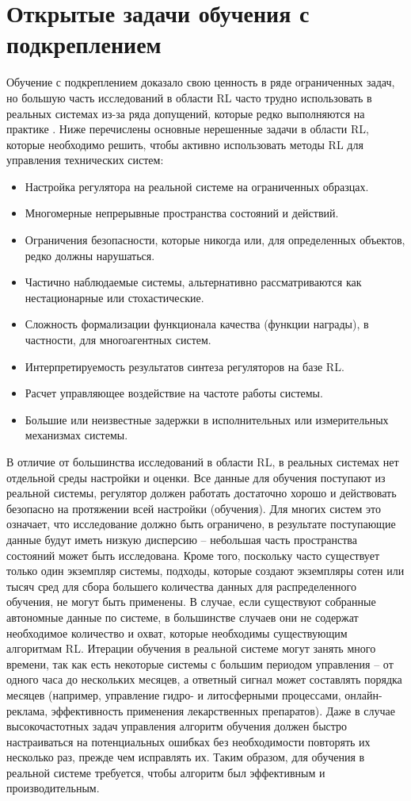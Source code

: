 \section{Открытые задачи обучения с подкреплением}

Обучение с подкреплением доказало свою ценность в ряде ограниченных задач, но большую часть исследований в области RL часто трудно использовать в реальных системах из-за ряда допущений, которые редко выполняются на практике \cite{dulac2019challenges}. Ниже перечислены основные нерешенные задачи в области RL, которые необходимо решить, чтобы активно использовать методы RL для управления технических систем:
\begin{itemize}
\item Настройка регулятора на реальной системе на ограниченных образцах.
\item Многомерные непрерывные пространства состояний и действий.
\item Ограничения безопасности, которые никогда или, для определенных объектов, редко должны нарушаться.
\item Частично наблюдаемые системы, альтернативно рассматриваются как нестационарные или стохастические.
\item Сложность формализации функционала качества (функции награды), в частности, для многоагентных систем.
\item Интерпретируемость результатов синтеза регуляторов на базе RL.
\item Расчет управляющее воздействие на частоте работы системы.
\item Большие или неизвестные задержки в исполнительных или измерительных механизмах системы.
\end{itemize}
В отличие от большинства исследований в области RL, в реальных системах нет отдельной среды настройки и оценки. Все данные для обучения поступают из реальной системы, регулятор должен работать достаточно хорошо и действовать безопасно на протяжении всей настройки (обучения). Для многих систем это означает, что исследование должно быть ограничено, в результате поступающие данные будут иметь низкую дисперсию -- небольшая часть пространства состояний может быть исследована. Кроме того, поскольку часто существует только один экземпляр системы, подходы, которые создают экземпляры сотен или тысяч сред для сбора большего количества данных для распределенного обучения, не могут быть применены. В случае, если существуют собранные автономные данные по системе, в большинстве случаев они не содержат необходимое количество и охват, которые необходимы существующим алгоритмам RL. Итерации обучения в реальной системе могут занять много времени, так как есть некоторые системы с большим периодом управления -- от одного часа до нескольких месяцев, а ответный сигнал может составлять порядка месяцев (например, управление гидро- и литосферными процессами, онлайн-реклама, эффективность применения лекарственных препаратов). Даже в случае высокочастотных задач управления алгоритм обучения должен быстро настраиваться на потенциальных ошибках без необходимости повторять их несколько раз, прежде чем исправлять их. Таким образом, для обучения в реальной системе требуется, чтобы алгоритм был эффективным и производительным.

